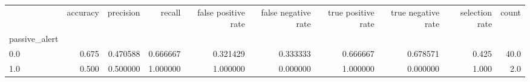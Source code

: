 \begin{tabular}{lrrrrrrrrr}
\toprule
{} &  accuracy &  precision &    recall &  false positive rate &  false negative rate &  true positive rate &  true negative rate &  selection rate &  count \\
passive\_alert &           &            &           &                      &                      &                     &                     &                 &        \\
\midrule
0.0           &     0.675 &   0.470588 &  0.666667 &             0.321429 &             0.333333 &            0.666667 &            0.678571 &           0.425 &   40.0 \\
1.0           &     0.500 &   0.500000 &  1.000000 &             1.000000 &             0.000000 &            1.000000 &            0.000000 &           1.000 &    2.0 \\
\bottomrule
\end{tabular}

